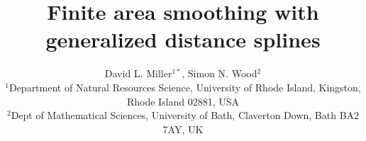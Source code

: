 \documentclass[useAMS, referee]{biom}
\title[Finite area smoothing with generalized distance splines]{Finite area smoothing with generalized distance splines}
\author{David L. Miller$^{1*}$\email{dave@ninepointeightone.net}, Simon N. Wood$^{2}$\\
$^{1}$Department of Natural Resources Science, University of Rhode Island, Kingston, Rhode Island 02881, USA\\
$^{2}$Dept of Mathematical Sciences, University of Bath, Claverton Down, Bath BA2 7AY, UK
}
\begin{document}








\label{firstpage}

\end{document}
